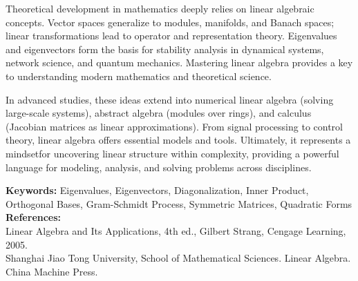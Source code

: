 Theoretical development in mathematics deeply relies on linear algebraic concepts. Vector spaces generalize to modules, manifolds, and Banach spaces; linear transformations lead to operator and representation theory. Eigenvalues and eigenvectors form the basis for stability analysis in dynamical systems, network science, and quantum mechanics. Mastering linear algebra provides a key to understanding modern mathematics and theoretical science.

In advanced studies, these ideas extend into numerical linear algebra (solving large-scale systems), abstract algebra (modules over rings), and calculus (Jacobian matrices as linear approximations). From signal processing to control theory, linear algebra offers essential models and tools. Ultimately, it represents a mindsetfor uncovering linear structure within complexity, providing a powerful language for modeling, analysis, and solving problems across disciplines.


\vspace{1cm}
\noindent
\textbf{Keywords:} Eigenvalues, Eigenvectors, Diagonalization, Inner Product, Orthogonal Bases, Gram-Schmidt Process, Symmetric Matrices, Quadratic Forms \\
\textbf{References:} \\
Linear Algebra and Its Applications, 4th ed., Gilbert Strang, Cengage Learning, 2005. \\
Shanghai Jiao Tong University, School of Mathematical Sciences. Linear Algebra. China Machine Press.

\cleardoublepage
